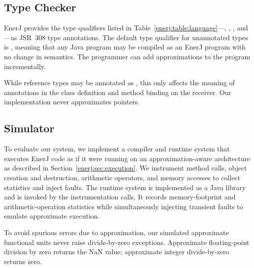 \subsection{Type Checker}
\label{enerj:checker}
EnerJ provides the type qualifiers listed
in Table~\ref{enerj:table:language}---, ,
, and ---as JSR~308 type annotations.
The default type qualifier for unannotated types is , meaning
that any Java program may be compiled as an EnerJ program with no change in
semantics. The programmer can add approximations to the
program incrementally.



While reference types may be annotated as , this only affects
the meaning of  annotations in the class definition and
method binding on the receiver. Our implementation never
approximates pointers.


\subsection{Simulator}
To evaluate our system, we implement a compiler and runtime
system that executes EnerJ code as if it were running on an
approximation-aware architecture
as described in Section~\ref{enerj:sec:execution}. We instrument method calls,
object creation and destruction, arithmetic operators, and memory
accesses to collect statistics and inject faults.
The runtime system is implemented as a Java library and is invoked by the
instrumentation calls.
It records memory-footprint and arithmetic-operation statistics
while simultaneously injecting transient faults to emulate approximate
execution.

To avoid spurious errors due to approximation, our simulated
approximate functional units never raise divide-by-zero exceptions. Approximate
floating-point division by zero returns the NaN value;
approximate integer divide-by-zero returns zero.


